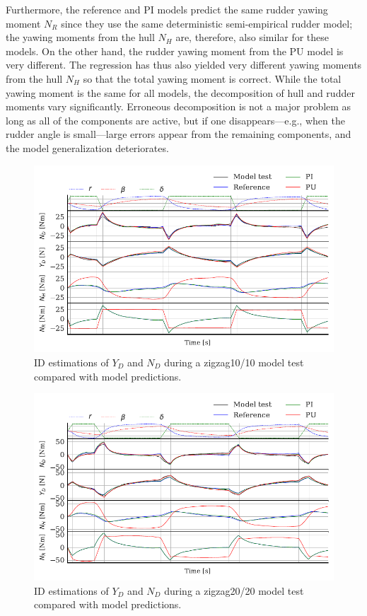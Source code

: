 Furthermore, the reference and PI models predict the same rudder yawing moment $N_R$ since they use the same deterministic semi-empirical rudder model; the yawing moments from the hull $N_H$ are, therefore, also similar for these models. On the other hand, the rudder yawing moment from the PU model is very different. The regression has thus also yielded very different yawing moments from the hull $N_H$ so that the total yawing moment is correct. 
While the total yawing moment is the same for all models, the decomposition of hull and rudder moments vary significantly. Erroneous decomposition is not a major problem as long as all of the components are active, but if one disappears---e.g., when the rudder angle is small---large errors appear from the remaining components, and the model generalization deteriorates.  
\begin{figure}[h]
    \centering
    \includegraphics{figures/results.ID_zigzag10.pdf}
    \caption{ID estimations of $Y_D$ and $N_D$ during a zigzag10/10 model test compared with model predictions.}
    \label{fig:ID_zigzag10}
\end{figure}
\begin{figure}[h]
    \centering
    \includegraphics{figures/results.ID_zigzag20.pdf}
    \caption{ID estimations of $Y_D$ and $N_D$ during a zigzag20/20 model test compared with model predictions.}
    \label{fig:ID_zigzag20}
\end{figure}
\FloatBarrier


